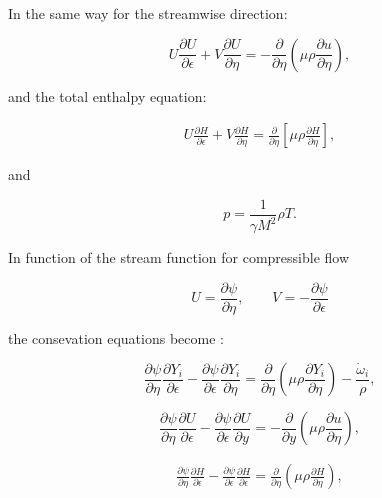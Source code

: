 In the same way for the streamwise direction: 

\begin{equation} 
U\frac{\partial U}{\partial \epsilon}
+
V\frac{\partial U}{\partial \eta}
=-
\frac{\partial}{\partial \eta}
\left(\mu\rho\frac{\partial u}{\partial \eta}\right)
,
\end{equation} 

and the total enthalpy equation:

\begin{equation*} 
\begin{split} 
U 
\frac{\partial H}{\partial \epsilon}
+
V 
\frac{\partial H}{\partial \eta}
=
\frac{\partial}{\partial \eta}
    \left[
    \mu
    \rho
    \frac{\partial H}{\partial \eta}
    \right]
    ,
\end{split} 
\end{equation*} 

and 

\begin{equation} 
p=\frac{1}{\gamma M^2} \rho T
.
\end{equation} 

In function of the stream function for compressible flow

\begin{equation} 
U
=
\frac{\partial \psi}{\partial \eta}
,
\qquad
V
=
-\frac{\partial \psi}{\partial \epsilon}
\end{equation} 


the consevation equations become
:

\begin{equation} 
\frac{\partial \psi}{\partial \eta}
\frac{\partial Y_{i}}{\partial \epsilon}
-
\frac{\partial \psi}{\partial \epsilon}
\frac{\partial Y_{i}}{\partial \eta}
=
\frac{\partial}{\partial \eta}
\left(\mu\rho \frac{\partial Y_i}{\partial \eta}\right)
-
\frac{\dot{\omega}_i}{\rho}
,
\end{equation} 


\begin{equation} 
\frac{\partial \psi}{\partial \eta}
\frac{\partial U}{\partial \epsilon}
-
\frac{\partial \psi}{\partial \epsilon}
\frac{\partial U}{\partial y}
=-
\frac{\partial}{\partial y}
\left(\mu\rho\frac{\partial u}{\partial \eta}\right)
,
\end{equation} 


\begin{equation*} 
\begin{split} 
\frac{\partial \psi}{\partial \eta}
\frac{\partial H}{\partial \epsilon}
-
\frac{\partial \psi}{\partial \epsilon}
\frac{\partial H}{\partial \epsilon}
=
\frac{\partial}{\partial \eta}
    \left(
    \mu
    \rho
    \frac{\partial H}{\partial \eta}
    \right)
    ,
\end{split} 
\end{equation*} 

